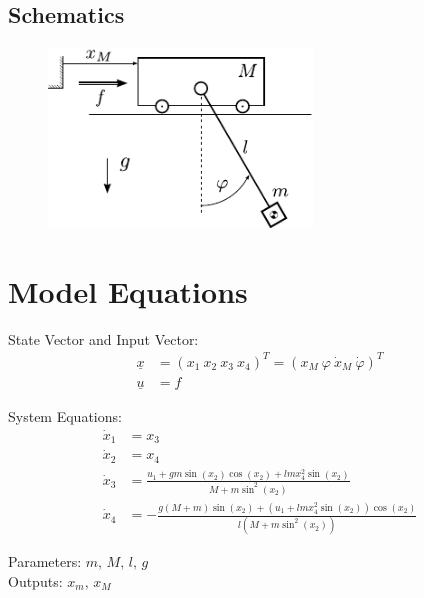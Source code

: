 \documentclass[10pt,a4paper]{article}
\begin{document}
	\begin{tabular}{ll}

	\end{tabular}


	\subsection{Schematics}
	\begin{figure}[H]
		\includegraphics[width=70mm]{sketch.pdf}
	\end{figure}


	\section{Model Equations} %

	State Vector and Input Vector:
	\begin{align*}
		\underline{x} &= (x_1 \ x_2 \ x_3 \ x_4)^T = (x_M\ \varphi\ \dot{x}_M \ \dot{\varphi})^T\\
		\underline{u} &= f
	\end{align*}

	\noindent System Equations:
	\begin{subequations}
	\begin{align}
		\dot{x}_1 &= x_3 \\
		\dot{x}_2 &= x_4 \\
		\dot{x}_3 &=   \frac{u_1 + gm\sin(x_2)\cos(x_2) + lmx_4^2\sin(x_2)}{M + m\sin^2(x_2)} \\
		\dot{x}_4 &= - \frac{g(M + m)\sin(x_2) + (u_1 + lmx_4^2\sin(x_2))\cos(x_2)}{l(M + m\sin^2(x_2))}
	\end{align}
	\end{subequations}

	\noindent
	Parameters: $m, \, M, \, l, \,g$ %
	\\
	Outputs: $x_m, \, x_M$ %
\end{document}
